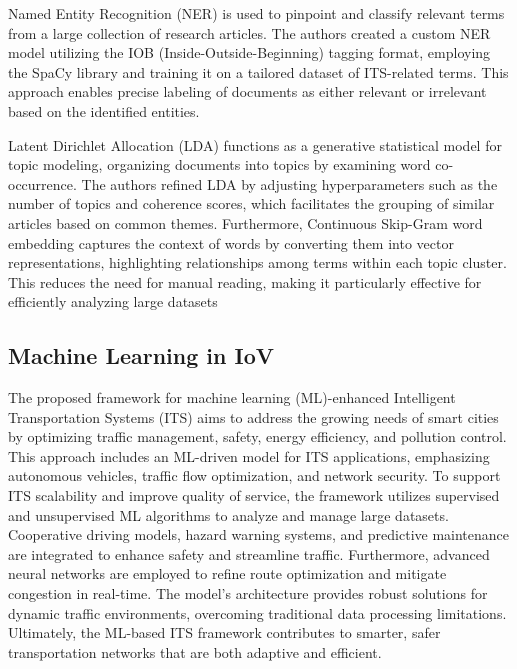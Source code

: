 \documentclass[12pt,twocolumn]{article}
\begin{document}
Named Entity Recognition (NER) is used to pinpoint and classify relevant terms from a large collection of research articles. The authors created a custom NER model utilizing the IOB (Inside-Outside-Beginning) tagging format, employing the SpaCy library and training it on a tailored dataset of ITS-related terms. This approach enables precise labeling of documents as either relevant or irrelevant based on the identified entities.

Latent Dirichlet Allocation (LDA) functions as a generative statistical model for topic modeling, organizing documents into topics by examining word co-occurrence. The authors refined LDA by adjusting hyperparameters such as the number of topics and coherence scores, which facilitates the grouping of similar articles based on common themes. Furthermore, Continuous Skip-Gram word embedding captures the context of words by converting them into vector representations, highlighting relationships among terms within each topic cluster. This reduces the need for manual reading, making it particularly effective for efficiently analyzing large datasets

\subsection{ Machine Learning in IoV}

The proposed framework for machine learning (ML)-enhanced Intelligent Transportation Systems (ITS) aims to address the growing needs of smart cities by optimizing traffic management, safety, energy efficiency, and pollution control. This approach includes an ML-driven model for ITS applications, emphasizing autonomous vehicles, traffic flow optimization, and network security.
To support ITS scalability and improve quality of service, the framework utilizes supervised and unsupervised ML algorithms to analyze and manage large datasets. Cooperative driving models, hazard warning systems, and predictive maintenance are integrated to enhance safety and streamline traffic. Furthermore, advanced neural networks are employed to refine route optimization and mitigate congestion in real-time. The model’s architecture provides robust solutions for dynamic traffic environments, overcoming traditional data processing limitations. Ultimately, the ML-based ITS framework contributes to smarter, safer transportation networks that are both adaptive and efficient.
\end{document}
